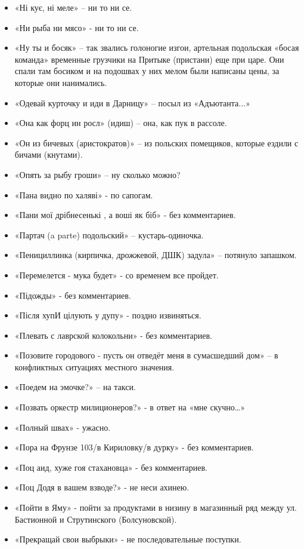 \begin{itemize}
\item  «Ні кує, ні меле» – ни то ни се. 
\item  «Ни рыба ни мясо» - ни то ни се.
\item  «Ну ты и босяк» – так звались голоногие изгои, артельная подольская «босая команда» временные грузчики на Притыке (пристани) еще при царе. Они спали там босиком и на подошвах у них мелом были написаны цены, за которые они нанимались.
\item  «Одевай курточку и иди в Дарницу» –  посыл из «Адъютанта...»
\item  «Она как форц ин росл» (идиш) – она, как пук в рассоле.
\item  «Он из бичевых (аристократов)» – из польских помещиков, которые ездили с бичами (кнутами). 
\item  «Опять за рыбу гроши» – ну сколько можно?
\item  «Пана видно по халяві» - по сапогам.
\item  «Пани мої дрібнесенькі , а воші як біб» - без комментариев.
\item  «Партач (a parte) подольский» – кустарь-одиночка.  
\item  «Пенициллинка (кирпичка, дрожжевой, ДШК) задула» – потянуло запашком.
\item  «Перемелется - мука будет» - со временем все пройдет.
\item  «Підожды» - без комментариев.
\item  «Після хупИ цілують у дупу» - поздно извиняться.
\item  «Плевать с лаврской колокольни» - без комментариев.
\item  «Позовите городового - пусть он отведёт меня в сумасшедший дом» – в конфликтных ситуациях местного значения.
\item  «Поедем на эмочке?» – на такси.
\item  «Позвать оркестр милиционеров?» - в ответ на «мне скучно…»
\item  «Полный швах» - ужасно.
\item  «Пора на Фрунзе 103/в Кириловку/в дурку» - без комментариев.
\item  «Поц аид, хуже гоя стахановца» - без комментариев.
\item  «Поц Додя в вашем взводе?» - не неси ахинею.
\item  «Пойти в Яму» - пойти за продуктами в низину в магазинный ряд между ул. Бастионной и Струтинского (Болсуновской). 
\item  «Прекращай свои выбрыки» - не последовательные поступки.

\end{itemize}
